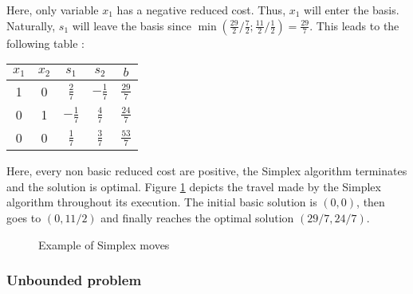 Here, only variable $x_1$ has a negative reduced cost. Thus, $x_1$ will enter the basis. Naturally, $s_1$ will leave the basis since $\min(\frac{29}{2}/\frac{7}2 ; \frac{11}2/\frac 12) = \frac{29}7$. This leads to the following table :
\begin{center}
    \begin{tabular}{cccc|c}
        $x_1$ & $x_2$ & $s_1$ & $s_2$ & $b$ \\\hline
        1 & 0 & $\frac 27$ & $-\frac 17$ & $\frac{29}7$\\
        0 & 1 & $-\frac 17$ & $\frac 47$ & $\frac{24}7$\\\hline
        0 & 0 & $\frac 17$ & $\frac 37$ & $\frac{53}7$
    \end{tabular}
\end{center}
Here, every non basic reduced cost are positive, the Simplex algorithm terminates and the solution is optimal. Figure \ref{fig:simplex_step} depicts the travel made by the Simplex algorithm throughout its execution. The initial basic solution is $(0,0)$, then goes to $(0,11/2)$ and finally reaches the optimal solution $(29/7,24/7)$.

\begin{figure}[h!]
    \caption{Example of Simplex moves}
    \label{fig:simplex_step}
\end{figure}

\subsubsection{Unbounded problem}

